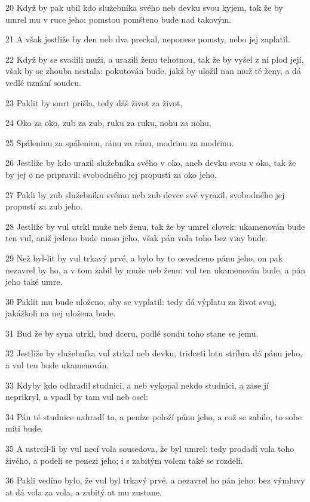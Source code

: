 \par 20 Když by pak ubil kdo služebníka svého neb devku svou kyjem, tak že by umrel mu v ruce jeho: pomstou pomšteno bude nad takovým.
\par 21 A však jestliže by den neb dva preckal, neponese pomsty, nebo jej zaplatil.
\par 22 Když by se svadili muži, a urazili ženu tehotnou, tak že by vyšel z ní plod její, však by se zhouba nestala: pokutován bude, jakž by uložil nan muž té ženy, a dá vedlé uznání soudcu.
\par 23 Paklit by smrt prišla, tedy dáš život za život,
\par 24 Oko za oko, zub za zub, ruku za ruku, nohu za nohu,
\par 25 Spáleninu za spáleninu, ránu za ránu, modrinu za modrinu.
\par 26 Jestliže by kdo urazil služebníka svého v oko, aneb devku svou v oko, tak že by jej o ne pripravil: svobodného jej propustí za oko jeho.
\par 27 Pakli by zub služebníku svému neb zub devce své vyrazil, svobodného jej propustí za zub jeho.
\par 28 Jestliže by vul utrkl muže neb ženu, tak že by umrel clovek: ukamenován bude ten vul, aniž jedeno bude maso jeho, však pán vola toho bez viny bude.
\par 29 Než byl-lit by vul trkavý prvé, a bylo by to osvedceno pánu jeho, on pak nezavrel by ho, a v tom zabil by muže neb ženu: vul ten ukamenován bude, a pán jeho také umre.
\par 30 Paklit mu bude uloženo, aby se vyplatil: tedy dá výplatu za život svuj, jakážkoli na nej uložena bude.
\par 31 Bud že by syna utrkl, bud dceru, podlé soudu toho stane se jemu.
\par 32 Jestliže by služebníka vul ztrkal neb devku, tridceti lotu stríbra dá pánu jeho, a vul ten bude ukamenován.
\par 33 Kdyby kdo odhradil studnici, a neb vykopal nekdo studnici, a zase jí neprikryl, a vpadl by tam vul neb osel:
\par 34 Pán té studnice nahradí to, a peníze položí pánu jeho, a což se zabilo, to sobe míti bude.
\par 35 A ustrcil-li by vul necí vola sousedova, že byl umrel: tedy prodadí vola toho živého, a podelí se penezi jeho; i s zabitým volem také se rozdelí.
\par 36 Pakli vedíno bylo, že vul byl trkavý prvé, a nezavrel ho pán jeho: bez výmluvy at dá vola za vola, a zabitý at mu zustane.


